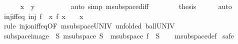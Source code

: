 \begin{isabellebody}
\ \ \ \ \isamarkupfalse%
\ {\isachardoublequoteopen}x\ {\isacharminus}{\kern0pt}\ y\ {\isacharequal}{\kern0pt}\ {}{\isachardoublequoteclose}\isanewline
\ \ \ \ \ \ \isamarkupfalse%
\ {\isacharparenleft}{\kern0pt}auto\ simp{\isacharcolon}{\kern0pt}\ m{}{\isachardot}{\kern0pt}subspace{\isacharunderscore}{\kern0pt}diff{\isacharparenright}{\kern0pt}\isanewline
\ \ \isamarkupfalse%
\isanewline
\ \ \isamarkupfalse%
\ \isamarkupfalse%
\ {\isacharquery}{\kern0pt}thesis\isanewline
\ \ \ \ \isamarkupfalse%
\ auto\isanewline
{}\isamarkupfalse%
%
\endisatagproof
{\isafoldproof}%
%
\isadelimproof
\isanewline
%
\endisadelimproof
\isanewline
{}\isamarkupfalse%
\ inj{\isacharunderscore}{\kern0pt}iff{\isacharunderscore}{\kern0pt}eq{\isacharunderscore}{\kern0pt}{}{\isacharcolon}{\kern0pt}\ {\isachardoublequoteopen}inj\ f\ {\isacharequal}{\kern0pt}\ {\isacharparenleft}{\kern0pt}{\isasymforall}x{\isachardot}{\kern0pt}\ f\ x\ {\isacharequal}{\kern0pt}\ {}\ {\isasymlongrightarrow}\ x\ {\isacharequal}{\kern0pt}\ {}{\isacharparenright}{\kern0pt}{\isachardoublequoteclose}\isanewline
%
\isadelimproof
\ \ %
\endisadelimproof
%
\isatagproof
{}\isamarkupfalse%
\ {\isacharparenleft}{\kern0pt}rule\ inj{\isacharunderscore}{\kern0pt}on{\isacharunderscore}{\kern0pt}iff{\isacharunderscore}{\kern0pt}eq{\isacharunderscore}{\kern0pt}{}{\isacharbrackleft}{\kern0pt}OF\ m{}{\isachardot}{\kern0pt}subspace{\isacharunderscore}{\kern0pt}UNIV{\isacharcomma}{\kern0pt}\ unfolded\ ball{\isacharunderscore}{\kern0pt}UNIV{\isacharbrackright}{\kern0pt}{\isacharparenright}{\kern0pt}%
\endisatagproof
{\isafoldproof}%
%
\isadelimproof
\isanewline
%
\endisadelimproof
\isanewline
{}\isamarkupfalse%
\ subspace{\isacharunderscore}{\kern0pt}image{\isacharcolon}{\kern0pt}\ \ S{\isacharcolon}{\kern0pt}\ {\isachardoublequoteopen}m{}{\isachardot}{\kern0pt}subspace\ S{\isachardoublequoteclose}\ \ {\isachardoublequoteopen}m{}{\isachardot}{\kern0pt}subspace\ {\isacharparenleft}{\kern0pt}f\ {\isacharbackquote}{\kern0pt}\ S{\isacharparenright}{\kern0pt}{\isachardoublequoteclose}\isanewline
%
\isadelimproof
\ \ %
\endisadelimproof
%
\isatagproof
{}\isamarkupfalse%
\ m{}{\isachardot}{\kern0pt}subspace{\isacharunderscore}{\kern0pt}def\isanewline
{}\isamarkupfalse%
\ safe\isanewline

\end{isabellebody}
